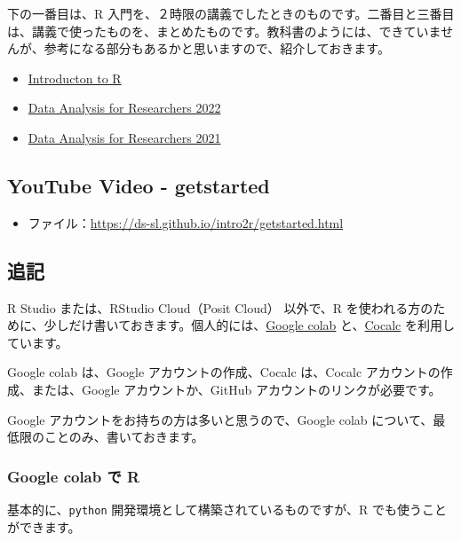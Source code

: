 \documentclass[
]{bxjsbook}
\providecommand{\tightlist}{%
  \setlength{\itemsep}{0pt}\setlength{\parskip}{0pt}}
\theoremstyle{definition}
\theoremstyle{definition}
\theoremstyle{definition}
\theoremstyle{definition}
\theoremstyle{remark}
\begin{document}
下の一番目は、R 入門を、２時限の講義でしたときのものです。二番目と三番目は、講義で使ったものを、まとめたものです。教科書のようには、できていませんが、参考になる部分もあるかと思いますので、紹介しておきます。

\begin{itemize}
\tightlist
\item
  \href{https://ds-sl.github.io/intro2r/intro2r.nb.html}{Introducton to R}
\item
  \href{https://icu-hsuzuki.github.io/da4r2022/}{Data Analysis for Researchers 2022}
\item
  \href{https://icu-hsuzuki.github.io/da4r2021/}{Data Analysis for Researchers 2021}
\end{itemize}

\hypertarget{youtube-video---getstarted}{%
\subsection{YouTube Video - getstarted}\label{youtube-video---getstarted}}

\begin{itemize}
\tightlist
\item
  ファイル：\url{https://ds-sl.github.io/intro2r/getstarted.html}
\end{itemize}

\hypertarget{ux8ffdux8a18}{%
\subsection{追記}\label{ux8ffdux8a18}}

R Studio または、RStudio Cloud（Posit Cloud） 以外で、R を使われる方のために、少しだけ書いておきます。個人的には、\href{https://colab.research.google.com}{Google colab} と、\href{https://cocalc.com}{Cocalc} を利用しています。

Google colab は、Google アカウントの作成、Cocalc は、Cocalc アカウントの作成、または、Google アカウントか、GitHub アカウントのリンクが必要です。

Google アカウントをお持ちの方は多いと思うので、Google colab について、最低限のことのみ、書いておきます。

\hypertarget{google-colab-ux3067-r}{%
\subsubsection{Google colab で R}\label{google-colab-ux3067-r}}

基本的に、\texttt{python} 開発環境として構築されているものですが、R でも使うことができます。
\end{document}

